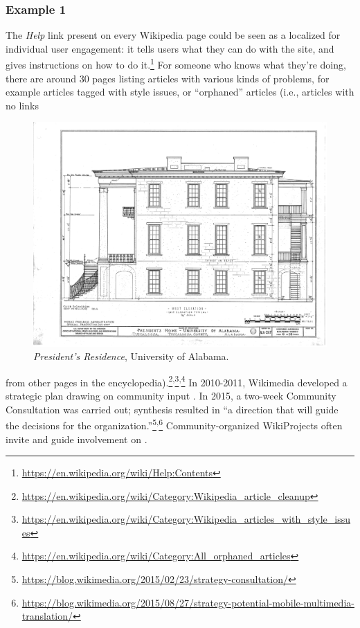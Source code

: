 \subsubsection*{Example 1}  The \emph{Help} link present on every Wikipedia page could be seen as a
localized  for individual user
engagement: it tells users what they can do with the site, and gives instructions on how to do it.\footnote{\url{https://en.wikipedia.org/wiki/Help:Contents}}
For someone who knows what they're doing, there are
around 30 pages listing articles with various kinds of problems, for
example articles tagged with style issues, or ``orphaned'' articles
(i.e., articles with no links
\begin{figure}
\vspace{-.3cm}
{\centering
\includegraphics[width=.32\textwidth,trim=140 30 30 30, clip=true]{alabama-gray}

\par}
\vspace{-.2cm}
\captionsetup{font=footnotesize,width=.3\textwidth}
\caption{\textsl{President's Residence}, University of Alabama.
\label{presidents-home}}
\vspace{-.8cm}
\end{figure}
 from other pages in the
encyclopedia).\footnote{\url{https://en.wikipedia.org/wiki/Category:Wikipedia_article_cleanup}}\textsuperscript{,}\footnote{\url{https://en.wikipedia.org/wiki/Category:Wikipedia_articles_with_style_issues}}\textsuperscript{,}\footnote{\url{https://en.wikipedia.org/wiki/Category:All_orphaned_articles}}
%
%
In 2010-2011, Wikimedia
 developed
a strategic plan drawing 
on community input \cite{wikimedia2011plan}.
  In 2015, a two-week 
Community Consultation was carried out; synthesis resulted in ``a direction that will guide the decisions for the organization.''\footnote{\url{https://blog.wikimedia.org/2015/02/23/strategy-consultation/}}\textsuperscript{,}\footnote{\url{https://blog.wikimedia.org/2015/08/27/strategy-potential-mobile-multimedia-translation/}}
%
%
 Community-organized WikiProjects often invite and guide involvement
 on .



